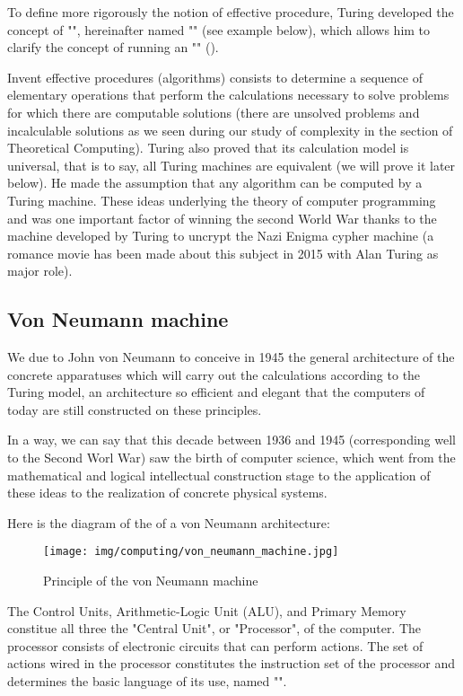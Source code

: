 	To define more rigorously the notion of effective procedure, Turing developed the concept of "", hereinafter named "" (see example below), which allows him to clarify the concept of running an "" ().
	
	Invent effective procedures (algorithms) consists to determine a sequence of elementary operations that perform the calculations necessary to solve problems for which there are computable solutions (there are unsolved problems and incalculable solutions as we seen during our study of complexity in the section of Theoretical Computing). Turing also proved that its calculation model is universal, that is to say, all Turing machines are equivalent (we will prove it later below). He made the assumption that any algorithm can be computed by a Turing machine. These ideas underlying the theory of computer programming and was one important factor of winning the second World War thanks to the machine developed by Turing to uncrypt the Nazi Enigma cypher machine (a romance movie has been made about this subject in 2015 with Alan Turing as major role).

	\subsection{Von Neumann machine}
	We due to John von Neumann to conceive in 1945 the general architecture of the concrete apparatuses which will carry out the calculations according to the Turing model, an architecture so efficient and elegant that the computers of today are still constructed on these principles.
	
	\begin{tcolorbox}[title=Remark,colframe=black,arc=10pt]
	In a way, we can say that this decade between 1936 and 1945 (corresponding well to the Second Worl War) saw the birth of computer science, which went from the mathematical and logical intellectual construction stage to the application of these ideas to the realization of concrete physical systems.
	\end{tcolorbox}
	Here is the diagram of the of a von Neumann architecture:
	\begin{figure}[H]
		\centering
		\texttt{[image: img/computing/von\_neumann\_machine.jpg]}
		\caption{Principle of the von Neumann machine}
	\end{figure}
	The Control Units, Arithmetic-Logic Unit (ALU), and Primary Memory constitue all three the "Central Unit", or "Processor", of the computer. The processor consists of electronic circuits that can perform actions. The set of actions wired in the processor constitutes the instruction set of the processor and determines the basic language of its use, named "".

